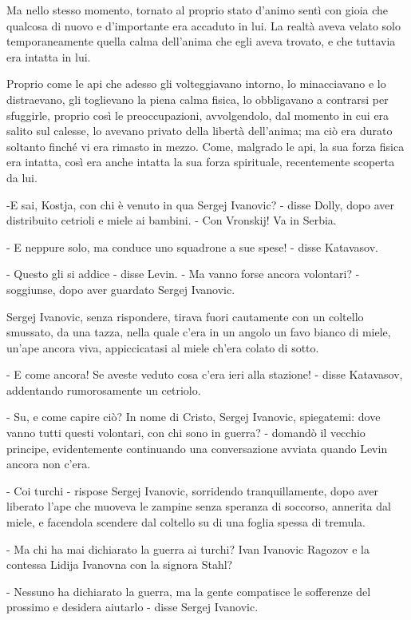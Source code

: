 Ma nello stesso momento, tornato al proprio stato d'animo sentì con gioia che qualcosa di nuovo e d'importante era accaduto in lui. La realtà aveva velato solo temporaneamente quella calma dell'anima che egli aveva trovato, e che tuttavia era intatta in lui. 

Proprio come le api che adesso gli volteggiavano intorno, lo minacciavano e lo distraevano, gli toglievano la piena calma fisica, lo obbligavano a contrarsi per sfuggirle, proprio così le preoccupazioni, avvolgendolo, dal momento in cui era salito sul calesse, lo avevano privato della libertà dell'anima; ma ciò era durato soltanto finché vi era rimasto in mezzo. Come, malgrado le api, la sua forza fisica era intatta, così era anche intatta la sua forza spirituale, recentemente scoperta da lui. 

-E sai, Kostja, con chi è venuto in qua Sergej Ivanovic? - disse Dolly, dopo aver distribuito cetrioli e miele ai bambini. - Con Vronskij! Va in Serbia. 

- E neppure solo, ma conduce uno squadrone a sue spese! - disse Katavasov. 

- Questo gli si addice - disse Levin. - Ma vanno forse ancora volontari? - soggiunse, dopo aver guardato Sergej Ivanovic. 

Sergej Ivanovic, senza rispondere, tirava fuori cautamente con un coltello smussato, da una tazza, nella quale c'era in un angolo un favo bianco di miele, un'ape ancora viva, appiccicatasi al miele ch'era colato di sotto. 

- E come ancora! Se aveste veduto cosa c'era ieri alla stazione! - disse Katavasov, addentando rumorosamente un cetriolo. 

- Su, e come capire ciò? In nome di Cristo, Sergej Ivanovic, spiegatemi: dove vanno tutti questi volontari, con chi sono in guerra? - domandò il vecchio principe, evidentemente continuando una conversazione avviata quando Levin ancora non c'era. 

- Coi turchi - rispose Sergej Ivanovic, sorridendo tranquillamente, dopo aver liberato l'ape che muoveva le zampine senza speranza di soccorso, annerita dal miele, e facendola scendere dal coltello su di una foglia spessa di tremula. 

- Ma chi ha mai dichiarato la guerra ai turchi? Ivan Ivanovic Ragozov e la contessa Lidija Ivanovna con la signora Stahl? 

- Nessuno ha dichiarato la guerra, ma la gente compatisce le sofferenze del prossimo e desidera aiutarlo - disse Sergej Ivanovic. 

